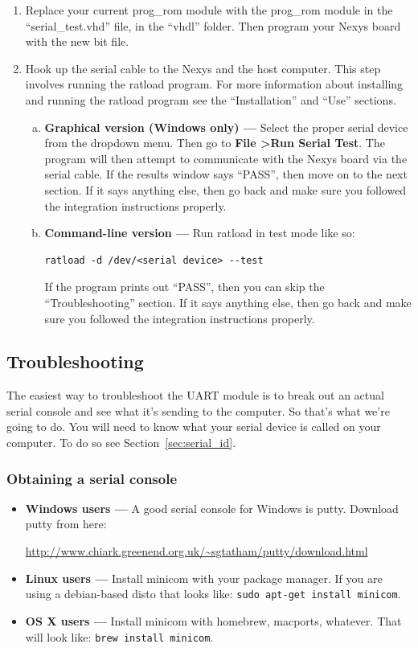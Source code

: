 \documentclass[notitlepage]{article}
\begin{document}
\begin{enumerate}
\item Replace your current prog\_rom module with the prog\_rom module in the ``serial\_test.vhd'' file, in the ``vhdl'' folder. Then program your Nexys board with the new bit file.
\item Hook up the serial cable to the Nexys and the host computer. This step involves running the ratload program. For more information about installing and running the ratload program see the ``Installation'' and ``Use'' sections.
  \begin{enumerate}[a.]
  \item \textbf{Graphical version (Windows only) ---} Select the proper serial device from the dropdown menu. Then go to \textbf{File \textgreater Run Serial Test}. The program will then attempt to communicate with the Nexys board via the serial cable. If the results window says ``PASS'', then move on to the next section. If it says anything else, then go back and make sure you followed the integration instructions properly.

  \item \textbf{Command-line version ---} Run ratload in test mode like so:
\begin{verbatim}
ratload -d /dev/<serial device> --test
\end{verbatim}
If the program prints out ``PASS'', then you can skip the ``Troubleshooting'' section. If it says anything else, then go back and make sure you followed the integration instructions properly.
  \end{enumerate}
\end{enumerate}

\subsection{Troubleshooting}
The easiest way to troubleshoot the UART module is to break out an actual serial console and see what it's sending to the computer. So that's what we're going to do. You will need to know what your serial device is called on your computer. To do so see Section~\ref{sec:serial_id}.
\subsubsection{Obtaining a serial console}
\begin{itemize}
\item \textbf{Windows users --- } A good serial console for Windows is putty. Download putty from here:\\
  \centerline{\url{http://www.chiark.greenend.org.uk/~sgtatham/putty/download.html}}
\item \textbf{Linux users --- } Install minicom with your package manager. If you are using a debian-based disto that looks like: \texttt{sudo apt-get install minicom}.
\item \textbf{OS X users --- } Install minicom with homebrew, macports, whatever. That will look like: \texttt{brew install minicom}.
\end{itemize}
\end{document}
